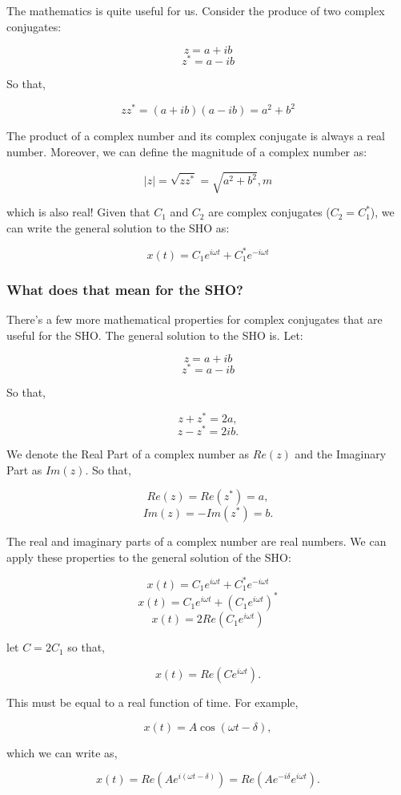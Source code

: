 \documentclass[11pt]{article}
\begin{document}
The mathematics is quite useful for us. Consider the produce of two
complex conjugates:

\[z = a + ib\] \[z^* = a - ib\]

So that,

\[zz^* = (a+ib)(a-ib) = a^2 + b^2\]

The product of a complex number and its complex conjugate is always a
real number. Moreover, we can define the magnitude of a complex number
as:

\[|z| = \sqrt{zz^*} = \sqrt{a^2 + b^2},m\]

which is also real! Given that \(C_1\) and \(C_2\) are complex
conjugates (\(C_2 = C_1^*\)), we can write the general solution to the
SHO as:

\[x(t) = C_1 e^{i\omega t} + C_1^* e^{-i\omega t}\]

\subsubsection{What does that mean for the
SHO?}\label{what-does-that-mean-for-the-sho}

There's a few more mathematical properties for complex conjugates that
are useful for the SHO. The general solution to the SHO is. Let:

\[z = a + ib\] \[z^* = a - ib\]

So that,

\[z+z^* = 2a,\] \[z-z^* = 2ib.\]

We denote the Real Part of a complex number as \(Re(z)\) and the
Imaginary Part as \(Im(z)\). So that,

\[Re(z) = Re(z^*) = a,\] \[Im(z) = -Im(z^*) = b.\]

The real and imaginary parts of a complex number are real numbers. We
can apply these properties to the general solution of the SHO:

\[x(t) = C_1 e^{i\omega t} + C_1^* e^{-i\omega t}\]
\[x(t) = C_1 e^{i\omega t} + \left(C_1 e^{i\omega t}\right)^*\]
\[x(t) = 2Re\left(C_1 e^{i\omega t}\right)\]

let \(C = 2C_1\) so that,

\[x(t) = Re\left(C e^{i\omega t}\right).\]

This must be equal to a real function of time. For example,

\[x(t)= A\cos(\omega t-\delta),\]

which we can write as,

\[x(t) = Re\left(Ae^{i(\omega t - \delta)}\right) = Re\left(Ae^{-i\delta}e^{i\omega t}\right).\]
\end{document}
